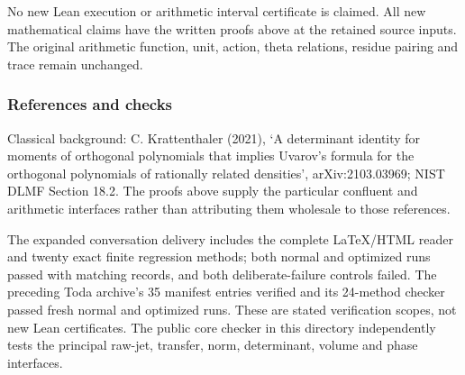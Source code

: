 No new Lean execution or arithmetic interval certificate is claimed. All new mathematical claims have the written proofs above at the retained source inputs. The original arithmetic function, unit, action, theta relations, residue pairing and trace remain unchanged.

\subsubsection{References and checks}\label{endpoint-pr24_original--references-and-checks}

Classical background: C. Krattenthaler (2021), `A determinant identity for moments of orthogonal polynomials that implies Uvarov's formula for the orthogonal polynomials of rationally related densities', arXiv:2103.03969; NIST DLMF Section 18.2. The proofs above supply the particular confluent and arithmetic interfaces rather than attributing them wholesale to those references.

The expanded conversation delivery includes the complete LaTeX/HTML reader and twenty exact finite regression methods; both normal and optimized runs passed with matching records, and both deliberate-failure controls failed. The preceding Toda archive's 35 manifest entries verified and its 24-method checker passed fresh normal and optimized runs. These are stated verification scopes, not new Lean certificates. The public core checker in this directory independently tests the principal raw-jet, transfer, norm, determinant, volume and phase interfaces.
